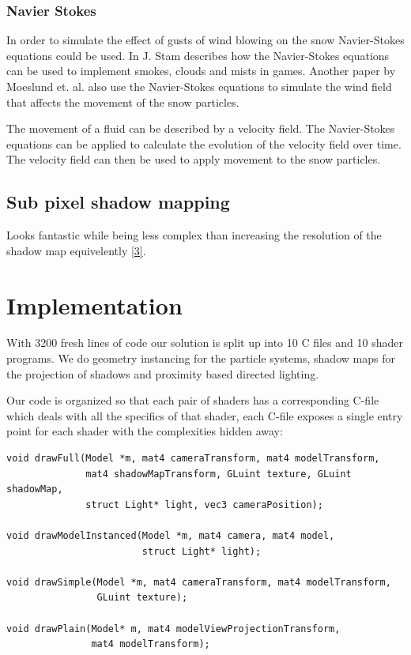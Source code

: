 \documentclass[a4paper,12pt]{article}
\begin{document}
\subsubsection{Navier Stokes}

In order to simulate the effect of gusts of wind blowing on the snow Navier-Stokes equations could be used. In \cite{fluid-dynamics} J. Stam describes how the Navier-Stokes equations can be used to implement smokes, clouds and mists in games. Another paper \cite{modeling-falling-accumulating-snow} by Moeslund et. al. also use the Navier-Stokes equations to simulate the wind field that affects the movement of the snow particles.

The movement of a fluid can be described by a velocity field. The Navier-Stokes equations can be applied to calculate the evolution of the velocity field over time. The velocity field can then be used to apply movement to the snow particles. \cite{fluid-dynamics}

\subsection{Sub pixel shadow mapping}
Looks fantastic while being less complex than increasing the resolution of the shadow map equivelently \href{https://www.youtube.com/watch?v=YSQDNy28SDM}{[3]}.



\section{Implementation}

With 3200 fresh lines of code our solution is split up into 10 C files and 10 shader programs. We do geometry instancing for the particle systems, shadow maps for the projection of shadows and proximity based directed lighting.

Our code is organized so that each pair of shaders has a corresponding C-file which deals with all the specifics of that shader, each C-file exposes a single entry point for each shader with the complexities hidden away:

\begin{lstlisting}[label=lst:entry-points,caption= The entry points of each shader pair\, listed in decreasing complexity.]
void drawFull(Model *m, mat4 cameraTransform, mat4 modelTransform,
              mat4 shadowMapTransform, GLuint texture, GLuint shadowMap,
              struct Light* light, vec3 cameraPosition);

void drawModelInstanced(Model *m, mat4 camera, mat4 model,
                        struct Light* light);

void drawSimple(Model *m, mat4 cameraTransform, mat4 modelTransform,
                GLuint texture);

void drawPlain(Model* m, mat4 modelViewProjectionTransform,
               mat4 modelTransform);
\end{lstlisting}
\end{document}
